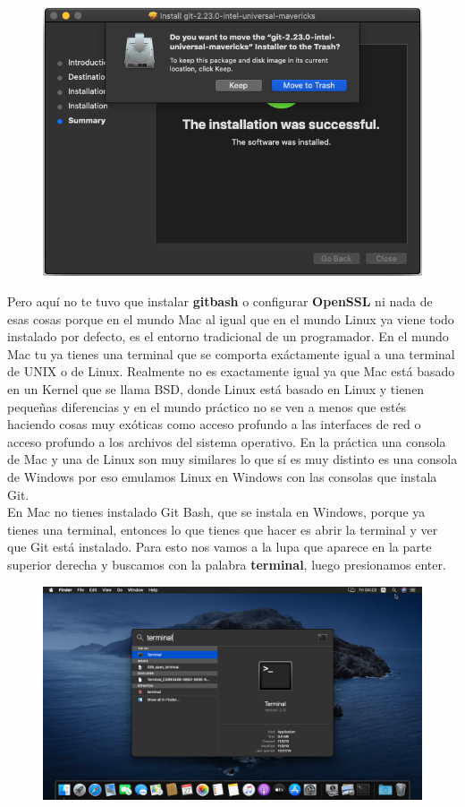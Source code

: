 \documentclass{article}
\begin{document}
\begin{figure}[h!]
  \centering
  \includegraphics[scale=0.5]{./Pictures/034_mac_git.png}
\end{figure}

Pero aquí no te tuvo que instalar \textbf{gitbash} o configurar
\textbf{OpenSSL} ni nada de esas cosas porque en el mundo Mac al igual que en
el mundo Linux ya viene todo instalado por defecto, es el entorno tradicional
de un programador. En el mundo Mac tu ya tienes una terminal que se comporta
exáctamente igual a una terminal de UNIX o de Linux. Realmente no es
exactamente igual ya que Mac está basado en un Kernel que se llama BSD, donde
Linux está basado en Linux y tienen pequeñas diferencias y en el mundo práctico
no se ven a menos que estés haciendo cosas muy exóticas como acceso profundo a
las interfaces de red o acceso profundo a los archivos del sistema operativo.
En la práctica una consola de Mac y una de Linux son muy similares lo que sí es
muy distinto es una consola de Windows por eso emulamos Linux en Windows con
las consolas que instala Git.\\

En Mac no tienes instalado Git Bash, que se instala en Windows, porque ya
tienes una terminal, entonces lo que tienes que hacer es abrir la terminal y
ver que Git está instalado. Para esto nos vamos a la lupa que aparece en la
parte superior derecha y buscamos con la palabra \textbf{terminal}, luego
presionamos enter.

\begin{figure}[h!]
  \centering
  \includegraphics[scale=0.4]{./Pictures/037_terminal.png}
\end{figure}
\end{document}
